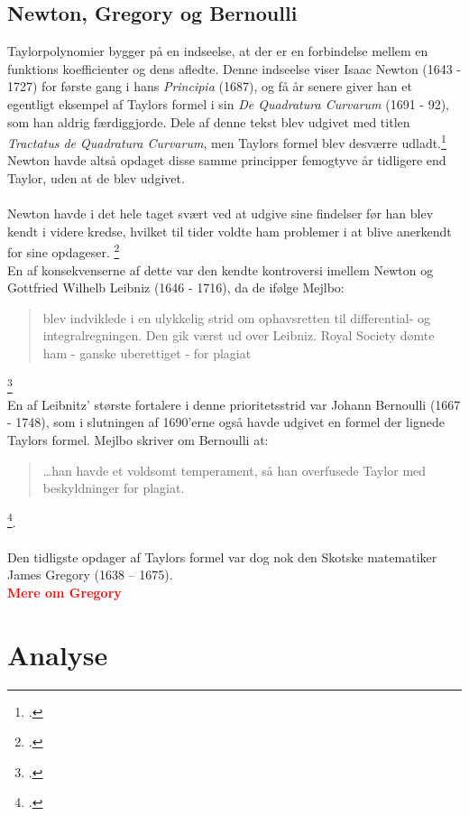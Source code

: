 \documentclass[12pt, a4paper]{article}
\begin{document}
\subsection{Newton, Gregory og Bernoulli}

Taylorpolynomier bygger på en indseelse, at der er en forbindelse mellem en funktions koefficienter og dens afledte. Denne indseelse viser Isaac Newton (1643 - 1727) for første gang i hans \textit{Principia} (1687), og få år senere giver han et egentligt eksempel af Taylors formel i sin \textit{De Quadratura Curvarum} (1691 - 92), som han aldrig færdiggjorde. Dele af denne tekst blev udgivet med titlen \textit{Tractatus de Quadratura Curvarum}, men Taylors formel blev desværre udladt.\footcite[s. 248]{roy_2021} Newton havde altså opdaget disse samme principper femogtyve år tidligere end Taylor, uden at de blev udgivet.\\
\\
Newton havde i det hele taget svært ved at udgive sine findelser før han blev kendt i videre kredse, hvilket til tider voldte ham problemer i at blive anerkendt for sine opdageser. \footcite[s. 116]{uendeligerækker}\\
En af konsekvenserne af dette var den kendte kontroversi imellem Newton og Gottfried Wilhelb Leibniz (1646 - 1716), da de ifølge Mejlbo:
\blockquote{blev indviklede i en ulykkelig strid om ophavsretten til differential- og integralregningen. Den gik værst  ud over Leibniz. Royal Society dømte ham - ganske uberettiget - for plagiat}.\footcite[s. 103]{uendeligerækker}\\
En af Leibnitz' største fortalere i denne prioritetsstrid var Johann Bernoulli (1667 - 1748), som i slutningen af 1690'erne også havde udgivet en formel der lignede Taylors formel. Mejlbo skriver om Bernoulli at: \blockquote{\dots han havde et voldsomt temperament, så han overfusede Taylor med beskyldninger for plagiat.}\footcite[s. 111]{uendeligerækker}.\\
\\
Den tidligste opdager af Taylors formel var dog nok den Skotske matematiker James Gregory (1638 – 1675).\\
\textcolor{red}{\textbf{Mere om Gregory}} 
\section{Analyse} %
\end{document}
